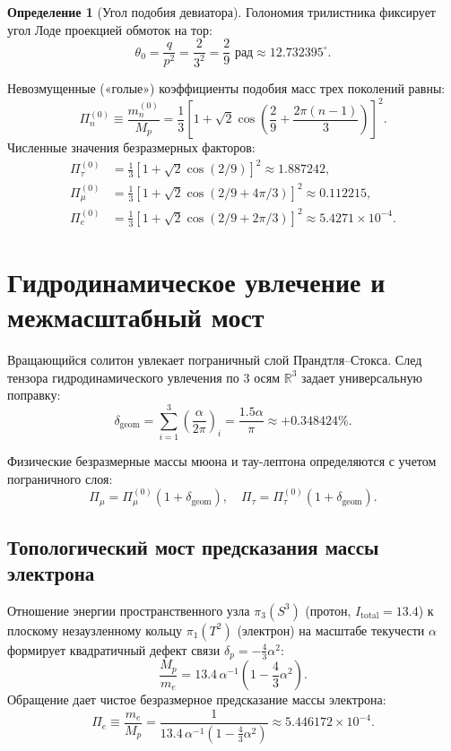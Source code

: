 \documentclass[11pt,a4paper]{article}
\theoremstyle{definition}
\newtheorem{definition}{Определение}
\theoremstyle{remark}
\begin{document}
\begin{definition}[Угол подобия девиатора]
Голономия трилистника фиксирует угол Лоде проекцией обмоток на тор:
\begin{equation}
    \theta_0 = \frac{q}{p^2} = \frac{2}{3^2} = \frac{2}{9}\text{ рад} \approx 12.732395^\circ.
\end{equation}
\end{definition}

Невозмущенные («голые») коэффициенты подобия масс трех поколений равны:
\begin{equation}
    \Pi_n^{(0)} \equiv \frac{m_n^{(0)}}{M_p} = \frac{1}{3} \left[ 1 + \sqrt{2} \cos\left( \frac{2}{9} + \frac{2\pi(n-1)}{3} \right) \right]^2.
\end{equation}
Численные значения безразмерных факторов:
\begin{align}
    \Pi_\tau^{(0)} &= \frac{1}{3} [1 + \sqrt{2}\cos(2/9)]^2 \approx 1.887242, \\
    \Pi_\mu^{(0)}  &= \frac{1}{3} [1 + \sqrt{2}\cos(2/9 + 4\pi/3)]^2 \approx 0.112215, \\
    \Pi_e^{(0)}    &= \frac{1}{3} [1 + \sqrt{2}\cos(2/9 + 2\pi/3)]^2 \approx 5.4271 \times 10^{-4}.
\end{align}

\section{Гидродинамическое увлечение и межмасштабный мост}
Вращающийся солитон увлекает пограничный слой Прандтля--Стокса. След тензора гидродинамического увлечения по 3 осям $\mathbb{R}^3$ задает универсальную поправку:
\begin{equation}
    \delta_{\mathrm{geom}} = \sum_{i=1}^3 \left(\frac{\alpha}{2\pi}\right)_i = \frac{1.5\alpha}{\pi} \approx +0.348424\%.
\end{equation}

Физические безразмерные массы мюона и тау-лептона определяются с учетом пограничного слоя:
\begin{equation}
    \Pi_\mu = \Pi_\mu^{(0)} (1 + \delta_{\mathrm{geom}}), \quad \Pi_\tau = \Pi_\tau^{(0)} (1 + \delta_{\mathrm{geom}}).
\end{equation}

\subsection{Топологический мост предсказания массы электрона}
Отношение энергии пространственного узла $\pi_3(S^3)$ (протон, $I_{\mathrm{total}} = 13.4$) к плоскому незаузленному кольцу $\pi_1(T^2)$ (электрон) на масштабе текучести $\alpha$ формирует квадратичный дефект связи $\delta_p = -\frac{4}{3}\alpha^2$:
\begin{equation}
    \frac{M_p}{m_e} = 13.4 \, \alpha^{-1} \left( 1 - \frac{4}{3}\alpha^2 \right).
\end{equation}
Обращение дает чистое безразмерное предсказание массы электрона:
\begin{equation}
    \Pi_e \equiv \frac{m_e}{M_p} = \frac{1}{13.4 \, \alpha^{-1} \left( 1 - \frac{4}{3}\alpha^2 \right)} \approx 5.446172 \times 10^{-4}.
\end{equation}
\end{document}
